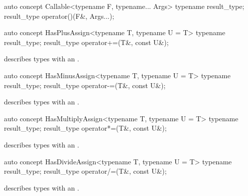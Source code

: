 \documentclass[american,twoside]{book}
\begin{document}
\begin{itemdecl}
auto concept Callable<typename F, typename... Args> {
  typename result_type;
  result_type operator()(F&, Args...);
}
\end{itemdecl}

\begin{itemdescr}
\pnum 
{}
\end{itemdescr}

\begin{itemdecl}
auto concept HasPlusAssign<typename T, typename U = T> {
  typename result_type;
  result_type operator+=(T&, const U&);
}
\end{itemdecl}

\begin{itemdescr}
\pnum
\mbox{\reallynote} describes types with an \mbox{}.
\end{itemdescr}

\begin{itemdecl}
auto concept HasMinusAssign<typename T, typename U = T> {
  typename result_type;
  result_type operator-=(T&, const U&);
}
\end{itemdecl}

\begin{itemdescr}
\pnum
\mbox{\reallynote} describes types with an \mbox{}.
\end{itemdescr}

\begin{itemdecl}
auto concept HasMultiplyAssign<typename T, typename U = T> {
  typename result_type;
  result_type operator*=(T&, const U&);
}
\end{itemdecl}

\begin{itemdescr}
\pnum
\mbox{\reallynote} describes types with an \mbox{}.
\end{itemdescr}

\begin{itemdecl}
auto concept HasDivideAssign<typename T, typename U = T> {
  typename result_type;
  result_type operator/=(T&, const U&);
}
\end{itemdecl}

\begin{itemdescr}
\pnum
\mbox{\reallynote} describes types with an \mbox{}.
\end{itemdescr}
\end{document}
